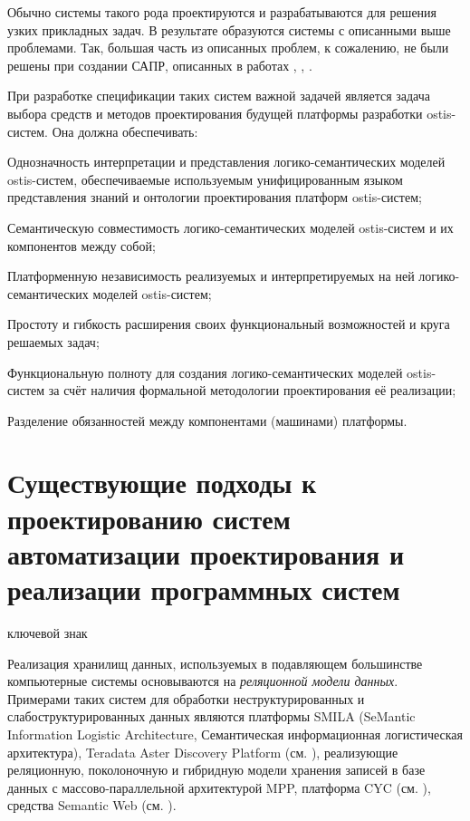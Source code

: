 Обычно системы такого рода проектируются и разрабатываются для решения узких прикладных задач. В результате образуются системы с описанными выше проблемами. Так, большая часть из описанных проблем, к сожалению, не были решены при создании САПР, описанных в работах , , .

При разработке спецификации таких систем важной задачей является задача выбора средств и методов проектирования
будущей платформы разработки ostis-систем. Она должна обеспечивать:

\begin{textitemize}
    \item Однозначность интерпретации и представления логико-семантических моделей ostis-систем, обеспечиваемые используемым унифицированным языком представления знаний и онтологии проектирования платформ ostis-систем;
    \item Семантическую совместимость логико-семантических моделей ostis-систем и их компонентов между собой;
    \item Платформенную независимость реализуемых и интерпретируемых на ней логико-семантических моделей ostis-систем;
    \item Простоту и гибкость расширения своих функциональный возможностей и круга решаемых задач;
    \item Функциональную полноту для создания логико-семантических моделей ostis-систем за счёт наличия формальной методологии проектирования её реализации;
    \item Разделение обязанностей между компонентами (машинами) платформы.
\end{textitemize}

\section{Существующие подходы к проектированию систем автоматизации проектирования и реализации программных систем}
\label{sec_soft_platform_problems}

\begin{SCn}

\begin{scnrelfromlist}{ключевой знак}
\end{scnrelfromlist}

\end{SCn}

\bigskip

Реализация хранилищ данных, используемых в подавляющем большинстве компьютерные системы основываются на \textit{реляционной модели данных}. Примерами таких систем для обработки неструктурированных и слабоструктурированных данных являются платформы SMILA (SeMantic Information Logistic Architecture, Семантическая информационная логистическая архитектура), Teradata Aster Discovery Platform (см. ), реализующие реляционную, поколоночную и гибридную модели хранения записей в базе данных с массово-параллельной архитектурой MPP, платформа CYC (см. \cite{CycPlatform2022}), средства Semantic Web (см. ).

